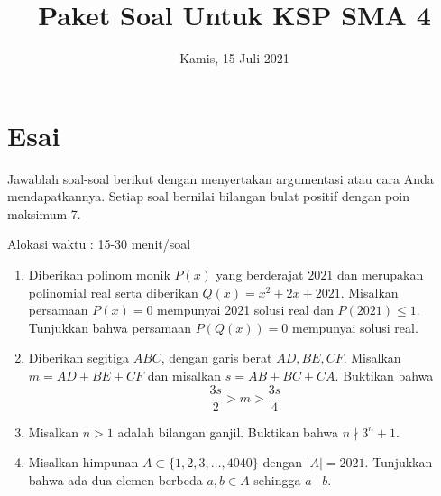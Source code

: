 \documentclass[12pt]{scrartcl}
\title{Paket Soal Untuk KSP SMA 4}
\date{Kamis, 15 Juli 2021}
\begin{document}
	\maketitle

\renewcommand*\contentsname{Daftar Isi}
\tableofcontents

\newpage

\section{Esai}
Jawablah soal-soal berikut dengan menyertakan argumentasi atau cara Anda mendapatkannya. Setiap soal bernilai bilangan bulat positif dengan poin maksimum 7.

Alokasi waktu : 15-30 menit/soal

\begin{enumerate}[resume]
	\item Diberikan polinom monik $P(x)$ yang berderajat $2021$ dan merupakan polinomial real serta diberikan
	$Q(x)=x^2+2x+2021$. Misalkan persamaan $P(x)=0$ mempunyai 2021 solusi real
	dan $P(2021) \le 1$. Tunjukkan bahwa persamaan $P(Q(x))=0$ mempunyai solusi real. 
	
	\item Diberikan segitiga $ABC$, dengan garis berat $AD, BE, CF$. Misalkan $m=AD+BE+CF$ dan misalkan $s=AB+BC+CA$. Buktikan bahwa $$\dfrac{3s}{2} > m > \dfrac{3s}{4}$$
	
	\item Misalkan $n > 1$ adalah bilangan ganjil. Buktikan bahwa $n \nmid 3^n + 1$.
	
	\item Misalkan himpunan $A \subset \{1,2,3,\dots,4040\}$ dengan $|A| = 2021$. Tunjukkan bahwa ada dua elemen berbeda $a,b \in A$ sehingga $a \mid b$.
\end{enumerate}
\end{document}
